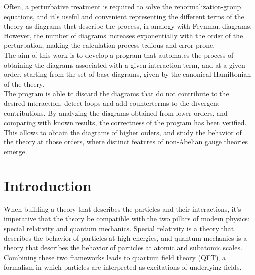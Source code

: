 \documentclass[11pt,a4paper,twoside,pdf]{article}
\numberwithin{equation}{section}
\begin{document}
\begin{center}
\begin{minipage}{0.8\linewidth}
Often, a perturbative treatment is required to solve the renormalization-group equations, 
and it's useful and convenient representing the different
terms of the theory as diagrams that describe the process, in analogy with Feynman diagrams.
However, the number of diagrams increases exponentially with the order of the perturbation,
making the calculation process tedious and error-prone. \\

The aim of this work is to develop a program \cite{Liu_Computational_tools_for_2025} that automates the process of
obtaining the diagrams associated with a given interaction term, and at a given order,
starting from the set of base diagrams, given by the canonical Hamiltonian of the
theory. \\

The program is able to discard the diagrams that do not contribute to the
desired interaction, detect loops and add counterterms to the divergent contributions.
By analyzing the diagrams obtained from lower orders, and comparing with known
results, the correctness of the program has been verified. This allows to obtain
the diagrams of higher orders, and study the behavior of the theory at those
orders, where distinct features of non-Abelian gauge theories emerge.

\end{minipage}

\newpage

\end{center}


\pagestyle{empty}       %
\tableofcontents
\setcounter{page}{0}       %


\pagestyle{fancy}
\fancyhead[RO,LE]{\leftmark}
\fancyhead[LO,RE]{\thepage}
\fancyfoot{}

\newpage

\section{Introduction}

When building a theory that describes the particles and their interactions, 
it's imperative that the theory be compatible with the two pillars of modern physics:
special relativity and quantum mechanics. Special relativity is a theory 
that describes the behavior of particles at high energies, and quantum 
mechanics is a theory that describes the behavior of particles at atomic and subatomic scales.
Combining these two frameworks leads to quantum field theory (QFT), a formalism 
in which particles are interpreted as excitations of underlying fields.
\end{document}
